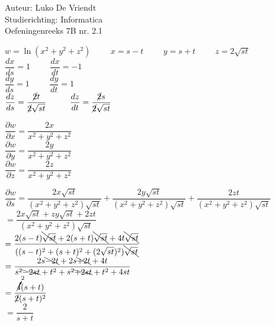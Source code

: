 \documentclass[a4paper]{article}
\newcommand{\hsp}{\hspace{1cm}}
\begin{document}
\noindent \large Auteur: Luko De Vriendt\\
\noindent \large Studierichting: Informatica\\
\noindent \large Oefeningenreeks 7B nr. 2.1\\

\medskip

\normalsize

$w = \ln (x^2 + y^2 + z^2) \hsp x = s-t \hsp y = s+t \hsp z = 2\sqrt{st}$ \\

$\dfrac{dx}{ds} = 1 \hsp \dfrac{dx}{dt} = -1$ \\

$\dfrac{dy}{ds} = 1 \hsp \dfrac{dy}{dt} = 1$ \\

$\dfrac{dz}{ds} = \dfrac{\cancel{2}t}{\cancel{2}\sqrt{st}} \hsp \dfrac{dz}{dt} = \dfrac{\cancel{2}s}{\cancel{2}\sqrt{st}}$ \\

\medskip

$\dfrac{\partial w}{\partial x} = \dfrac{2x}{x^2 + y^2 + z^2}$ \\

$\dfrac{\partial w}{\partial y} = \dfrac{2y}{x^2 + y^2 + z^2}$ \\

$\dfrac{\partial w}{\partial z} = \dfrac{2z}{x^2 + y^2 + z^2}$ \\

\medskip

$\dfrac{\partial w}{\partial s} = \dfrac{2x\sqrt{st}}{(x^2 + y^2 + z^2)\sqrt{st}} + \dfrac{2y\sqrt{st}}{(x^2 + y^2 + z^2)\sqrt{st}} + \dfrac{2zt}{(x^2 + y^2 + z^2)\sqrt{st}}$ \\

$= \dfrac{2x\sqrt{st} + zy\sqrt{st} + 2zt}{(x^2 + y^2 + z^2)\sqrt{st}}$ \\

$= \dfrac{2(s-t)\bcancel{\sqrt{st}} +2(s+t)\bcancel{\sqrt{st}}+4t\bcancel{\sqrt{st}}}{((s-t)^2+(s+t)^2 +(2\sqrt{st})^2)\bcancel{\sqrt{st}}}$ \\

$=\dfrac{2s \bcancel{- 2t} + 2s \bcancel{+ 2t} + 4t}{s^2 \bcancel{-2st} + t^2 + s^2 \bcancel{+ 2st} + t^2 + 4st}$ \\

$= \dfrac{\cancelto{2}{4}(s+t)}{\cancel{2}(s+t)^2}$ \\

$= \dfrac{2}{s+t}$ \\
\end{document}
